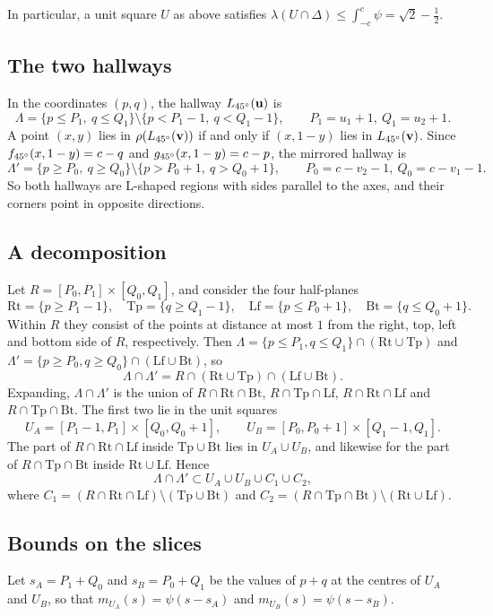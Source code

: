 In particular, a unit square $U$ as above satisfies $\lambda(U\cap\Delta)\le\int_{-c}^{c}\psi=\sqrt2-\frac12$.

\subsection*{The two hallways}
In the coordinates $(p,q)$, the hallway $L_{45^{\circ}}(\mathbf{u})$ is
\[
\Lambda=\{p\le P_1,\ q\le Q_1\}\setminus\{p<P_1-1,\ q<Q_1-1\},\qquad P_1=u_1+1,\ Q_1=u_2+1 .
\]
A point $(x,y)$ lies in $\rho(L_{45^{\circ}}(\mathbf{v}))$ if and only if $(x,1-y)$ lies in $L_{45^{\circ}}(\mathbf{v})$. Since $f_{45^{\circ}}(x,1-y)=c-q$ and $g_{45^{\circ}}(x,1-y)=c-p$, the mirrored hallway is
\[
\Lambda'=\{p\ge P_0,\ q\ge Q_0\}\setminus\{p>P_0+1,\ q>Q_0+1\},\qquad P_0=c-v_2-1,\ Q_0=c-v_1-1 .
\]
So both hallways are L-shaped regions with sides parallel to the axes, and their corners point in opposite directions.

\subsection*{A decomposition}
Let $R=[P_0,P_1]\times[Q_0,Q_1]$, and consider the four half-planes
\[
\mathrm{Rt}=\{p\ge P_1-1\},\quad \mathrm{Tp}=\{q\ge Q_1-1\},\quad \mathrm{Lf}=\{p\le P_0+1\},\quad \mathrm{Bt}=\{q\le Q_0+1\}.
\]
Within $R$ they consist of the points at distance at most $1$ from the right, top, left and bottom side of $R$, respectively. Then $\Lambda=\{p\le P_1,q\le Q_1\}\cap(\mathrm{Rt}\cup\mathrm{Tp})$ and $\Lambda'=\{p\ge P_0,q\ge Q_0\}\cap(\mathrm{Lf}\cup\mathrm{Bt})$, so
\[
\Lambda\cap\Lambda'=R\cap(\mathrm{Rt}\cup\mathrm{Tp})\cap(\mathrm{Lf}\cup\mathrm{Bt}).
\]
Expanding, $\Lambda\cap\Lambda'$ is the union of $R\cap\mathrm{Rt}\cap\mathrm{Bt}$, $R\cap\mathrm{Tp}\cap\mathrm{Lf}$, $R\cap\mathrm{Rt}\cap\mathrm{Lf}$ and $R\cap\mathrm{Tp}\cap\mathrm{Bt}$. The first two lie in the unit squares
\[
U_A=[P_1-1,P_1]\times[Q_0,Q_0+1], \qquad U_B=[P_0,P_0+1]\times[Q_1-1,Q_1].
\]
The part of $R\cap\mathrm{Rt}\cap\mathrm{Lf}$ inside $\mathrm{Tp}\cup\mathrm{Bt}$ lies in $U_A\cup U_B$, and likewise for the part of $R\cap\mathrm{Tp}\cap\mathrm{Bt}$ inside $\mathrm{Rt}\cup\mathrm{Lf}$. Hence
\[
\Lambda\cap\Lambda'\subset U_A\cup U_B\cup C_1\cup C_2,
\]
where $C_1=(R\cap\mathrm{Rt}\cap\mathrm{Lf})\setminus(\mathrm{Tp}\cup\mathrm{Bt})$ and $C_2=(R\cap\mathrm{Tp}\cap\mathrm{Bt})\setminus(\mathrm{Rt}\cup\mathrm{Lf})$.

\subsection*{Bounds on the slices}
Let $s_A=P_1+Q_0$ and $s_B=P_0+Q_1$ be the values of $p+q$ at the centres of $U_A$ and $U_B$, so that $m_{U_A}(s)=\psi(s-s_A)$ and $m_{U_B}(s)=\psi(s-s_B)$.

